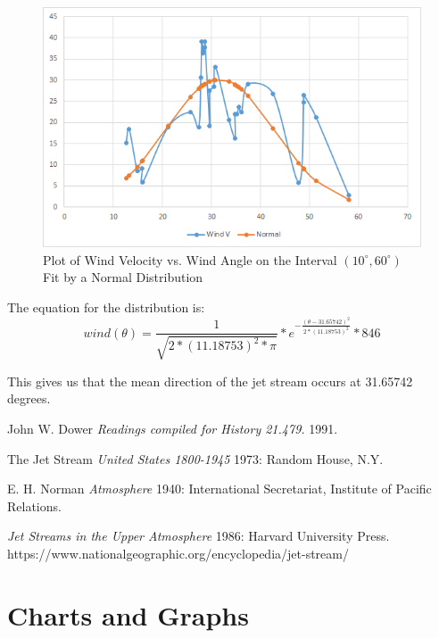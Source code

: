 \documentclass{article}
\begin{document}
\begin{figure}[H]
  \centering
  \includegraphics[width=\textwidth]{alan-data-2.png}
  \caption{Plot of Wind Velocity vs. Wind Angle on the Interval $(10^{\circ}, 60^{\circ})$ Fit by a Normal Distribution}
\end{figure}


The equation for the distribution is:
\[
wind(\theta) = \frac{1}{\sqrt{2*(11.18753)^2*\pi}}*e^{-\frac{(\theta-31.65742)^2}{2*(11.18753)^2}}*846
\]

This gives us that the mean direction of the jet stream occurs at 31.65742 degrees.




\begin{thebibliography}{1}

 John W. Dower {\em Readings compiled for History
21.479.}  1991.

  The Jet Stream {\em United States 1800-1945} 1973:
Random House, N.Y.

 E. H. Norman {\em Atmosphere} 1940: International Secretariat, Institute of Pacific
Relations.

 {\em Jet Streams in the Upper Atmosphere} 1986: Harvard University Press. https://www.nationalgeographic.org/encyclopedia/jet-stream/

\end{thebibliography}



\appendix
\section{Charts and Graphs}
\end{document}
